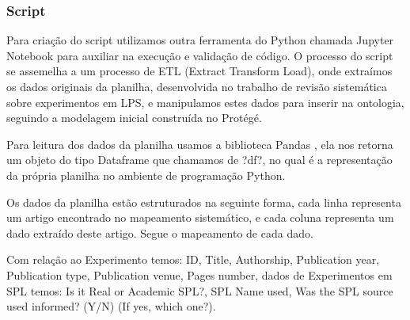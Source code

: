 \subsubsection{Script}

Para criação do script utilizamos outra ferramenta do Python chamada Jupyter Notebook \cite{PER-GRA:2007} para auxiliar na execução e validação de código. O processo do script se assemelha a um processo de ETL (Extract Transform Load), onde extraímos os dados originais da planilha, desenvolvida no trabalho de revisão sistemática sobre experimentos em LPS, e manipulamos estes dados para inserir na ontologia, seguindo a modelagem inicial construída no Protégé.

Para  leitura dos dados da planilha usamos a biblioteca Pandas \cite{mckinney-proc-scipy-2010}, ela nos retorna um objeto do tipo Dataframe que chamamos de ?df?, no qual é a representação da própria planilha no ambiente de programação Python.

Os dados da planilha estão estruturados na seguinte forma, cada linha representa um artigo encontrado no mapeamento sistemático, e cada coluna representa um dado extraído deste artigo. Segue o mapeamento de cada dado. 

Com relação ao Experimento temos:  ID,  Title, Authorship, Publication year, Publication type, Publication venue, Pages number, dados de Experimentos em SPL temos: Is it Real or Academic SPL?, SPL Name used, Was the SPL source used informed? (Y/N) (If yes, which one?). 

